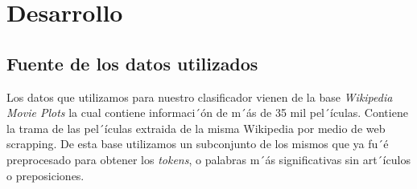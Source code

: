 \section{Desarrollo}
\label{sec:desarrollo}

\subsection{Fuente de los datos utilizados}

Los datos que utilizamos para nuestro clasificador vienen de la base \textit{Wikipedia
Movie Plots} \cite{wiki-movie-plot} la cual contiene informaci´ón de m´ás de 35 mil pel´ículas. Contiene la trama de las pel´ículas extraida de la misma Wikipedia por medio de web scrapping. De esta base utilizamos un subconjunto de los mismos \cite{wiki-movie-plot-tokens} que ya fu´é preprocesado para obtener los \textit{tokens}, o palabras m´ás significativas sin art´ículos o preposiciones. 